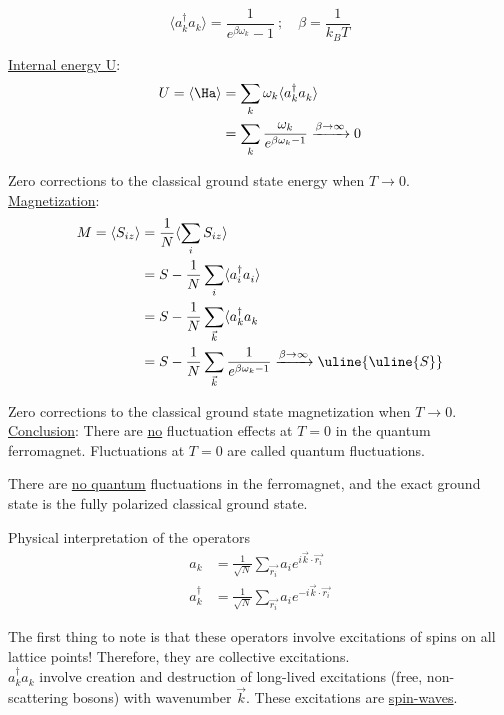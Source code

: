 \begin{equation}
    \langle a_k^\dagger a_k \rangle = \frac{1}{e^{\beta \omega_k} - 1} \ ; \quad \beta = \frac{1}{k_B T}
\end{equation}

\uline{Internal energy U}:
\begin{align}
    U = \langle \Ha \rangle &= \sum_k \omega_k \langle a_k^\dagger a_k^{} \rangle \\
    &= \sum_k \frac{\omega_k}{e^{\beta \omega_k - 1 }} \xrightarrow{\beta \rightarrow \infty} 0 
\end{align}

Zero corrections to the classical ground state energy when $T \rightarrow 0$. \\

\uline{Magnetization}:
\begin{align}
    M = \langle S_{iz} \rangle &= \frac{1}{N} \langle \sum_i S_{iz} \rangle \\
    &= S - \frac{1}{N} \sum_i \langle a_i^\dagger a_i^{} \rangle \\
    &= S - \frac{1}{N} \sum_{\Vec{k}} \langle a_k^\dagger a_k^{} \\
    &= S - \frac{1}{N} \sum_{\Vec{k}} \frac{1}{e^{\beta \omega_k - 1}} \xrightarrow{\beta \rightarrow \infty} \uline{\uline{ S }}
\end{align}

Zero corrections to the classical ground state magnetization when $T \rightarrow 0$. \\

 \uline{Conclusion}: There are \uline{no} fluctuation effects at $T = 0$ in the quantum ferromagnet. Fluctuations at $T = 0$ are called quantum fluctuations.

\begin{tcolorbox}
    There are \uline{no quantum} fluctuations in the ferromagnet, and the exact ground state is the fully polarized classical ground state.
\end{tcolorbox}

Physical interpretation of the operators
\begin{align}
    a_k &= \frac{1}{\sqrt{N}}\sum_{\Vec{r_i}}a_i e^{i \Vec{k} \cdot \Vec{r_i}} \\
    a_k^\dagger &= \frac{1}{\sqrt{N}}\sum_{\Vec{r_i}}a_i e^{-i \Vec{k} \cdot \Vec{r_i}}
\end{align}

The first thing to note is that these operators involve excitations of spins on all lattice points! Therefore, they are collective excitations. \\
 $a_k^\dagger a_k^{}$ involve creation and destruction of long-lived excitations (free, non-scattering bosons) with wavenumber $\Vec{k}$. These excitations are \uline{spin-waves}. \\

